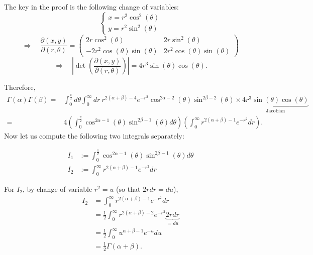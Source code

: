  \begin{frame}
 The key in the proof is the following change of variables:
\vfill
 \[
 \begin{cases}
 x = r^2 \cos^2(\theta)\\
 y = r^2 \sin^2(\theta)
 \end{cases}
 \]
\vfill
 \[
 \Longrightarrow \quad
	 \frac{\partial (x,y)}{\partial (r,\theta)}
 =\begin{pmatrix}
   2r \cos^2(\theta) & 2r\sin^2(\theta) \\
   -2r^2 \cos(\theta)\sin(\theta) & 2r^2 \cos(\theta)\sin(\theta)
  \end{pmatrix}
 \]
\vfill
 \[
 \Longrightarrow \quad \left|\det\left(
 \frac{\partial (x,y)}{\partial (r,\theta)}\right)
 \right| = 4r^3 \sin(\theta)\cos(\theta).
 \]
 \end{frame}
\begin{frame}
 Therefore,
  \begin{align*}
 \Gamma(\alpha)\Gamma(\beta)
 = &
 \int_0^{\frac{\pi}{2}}d\theta \int_0^\infty dr \:
 r^{2(\alpha+\beta)-4} e^{-r^2} \cos^{2\alpha-2}(\theta)\sin^{2\beta-2}(\theta) \times \underbrace{4 r^3 \sin(\theta) \cos(\theta)}_{\text{Jacobian}}\\
 = & 4 \left(\int_0^{\frac{\pi}{2}}
 \cos^{2\alpha-1}(\theta)\sin^{2\beta-1}(\theta)d\theta \right)
 \left(\int_0^\infty r^{2(\alpha+\beta)-1}e^{-r^2}dr\right).
 \end{align*}
 \vfill
 Now let us compute the following two integrals separately:
\vfill

\begin{align*}
	I_1 &:=\int_0^{\frac{\pi}{2}}
 \cos^{2\alpha-1}(\theta)\sin^{2\beta-1}(\theta)d\theta
 \\[1em]
	I_2 &:= \int_0^\infty r^{2(\alpha+\beta)-1}e^{-r^2}dr
\end{align*}

\end{frame}
\begin{frame}
For $I_2$, by change of variable $r^2 = u$ (so that $2rdr =du$),
\vfill
\begin{align*}
	I_2 &  =
\int_0^\infty r^{2(\alpha+\beta)-1}e^{-r^2}dr\\
&= \frac{1}{2}\int_0^\infty r^{2(\alpha+\beta)-2}e^{-r^2} \underbrace{2rdr}_{=du}\\
&= \frac{1}{2}\int_0^\infty u^{\alpha+\beta-1}e^{-u}du\\
&=\frac{1}{2} \Gamma(\alpha+\beta).
\end{align*}
\end{frame}
